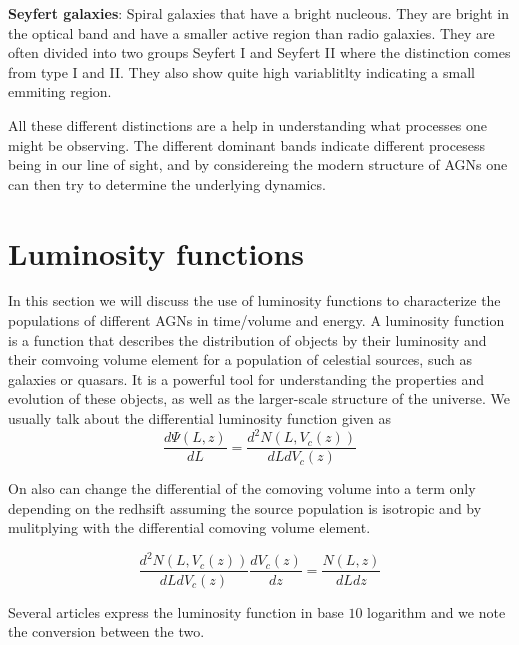 \documentclass{article}
\begin{document}
\textbf{Seyfert galaxies}:
Spiral galaxies that have a bright nucleous. They are bright in the optical band and have a smaller active region 
than radio galaxies. They are often divided into two groups Seyfert I and Seyfert II where the distinction comes from type I and II. 
They also show quite high variablitlty indicating a small emmiting region. 



All these different distinctions are a help in understanding what processes one might be observing. The different
dominant bands indicate different procesess being in our line of sight, and by considereing the modern structure of 
AGNs one can then try to determine the underlying dynamics.  


\section{ Luminosity functions}
In this section we will discuss the use of luminosity functions to characterize the populations of different AGNs in time/volume and energy. 
A luminosity function is a function that describes the distribution of objects by their luminosity and their comvoing volume element for a population of celestial sources,
such as galaxies or quasars. It is a powerful tool for understanding the properties and evolution of 
these objects, as well as the larger-scale structure of the universe. 
 We usually talk about the differential luminosity function given as
\begin{equation}
    \frac{d\Psi(L,z)}{dL} = \frac{d^2N(L,V_c(z))}{dLdV_c(z)}
\end{equation}

On also can change the differential of the comoving volume into a term only depending on the redhsift assuming the source population is isotropic and by mulitplying with the differential comoving volume element.

\begin{equation}
    \frac{d^2N(L,V_c(z))}{dLdV_c(z)}\frac{dV_c(z)}{dz} = \frac{N(L,z)}{dLdz}
\end{equation}


Several articles express the luminosity function in base $10$ logarithm and we note the conversion between the two. 
\end{document}
